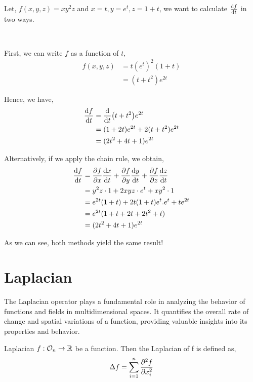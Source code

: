 \documentclass[../Analysis-3.tex]{subfiles}
\begin{document}
\begin{Eg}{}{}
    Let, $f(x,y,z) = xy^{2}z$ and $x=t, y=e^t, z= 1+t$, we want to calculate $\dv{f}{t}$ in two ways.

    \

    First, we can write $f$ as a function of $t$,
    \begin{align*}
        f(x,y,z)
         & = t(e^t)^2(1+t) \\
         & = (t+t^2)e^{2t}
    \end{align*}

    Hence, we have, \begin{align*}
        \dv{f}{t}
         & = \dv{t}(t+t^2)e^{2t}           \\
         & = (1+2t)e^{2t} + 2(t+t^2)e^{2t} \\
         & = (2t^2+4t+1)e^{2t}
    \end{align*}

    Alternatively, if we apply the chain rule, we obtain,
    \begin{align*}
        \dv{f}{t}
         & = \pdv{f}{x} \dv{x}{t} + \pdv{f}{y} \dv{y}{t} + \pdv{f}{z} \dv{z}{t} \\
         & = y^2z\cdot 1 + 2xyz\cdot e^t + xy^2\cdot 1                          \\
         & = e^{2t}(1+t) + 2t(1+t)e^t.e^t + te^{2t}                             \\
         & = e^{2t}(1+t+2t+2t^2+t)                                              \\
         & = (2t^2+4t+1)e^{2t}
    \end{align*}

    As we can see, both methods yield the same result!
\end{Eg}


\section{Laplacian}

The Laplacian operator plays a fundamental role in analyzing the behavior of functions and fields in multidimensional spaces. It quantifies the overall rate of change and spatial variations of a function, providing valuable insights into its properties and behavior.

\begin{Def}{Laplacian}{}
    $f : \mathcal{O}_{n} \to \mathbb{R}$ be a function. Then the Laplacian of f is defined as, \[ \Delta f = \sum_{i = 1}^{n} \pdv[2]{f}{x_i}   \]
\end{Def}
\end{document}
